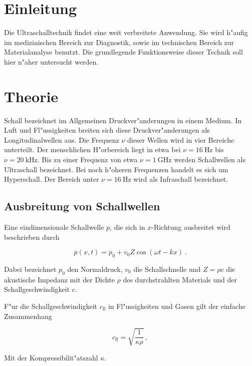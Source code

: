 \section{Einleitung} %
\label{sec:einleitung}
	Die Ultraschalltechnik findet eine weit verbreitete Anwendung.
	Sie wird h"aufig im medizinischen Bereich zur Diagnostik, sowie im technischen Bereich zur Materialanalyse benutzt.
	Die grundlegende Funktionsweise dieser Technik soll hier n"aher untersucht werden.
\section{Theorie} %
\label{sec:theorie}
	Schall bezeichnet im Allgemeinen Druckver"anderungen in einem Medium.
	In Luft und Fl"ussigkeiten breiten sich diese Druckver"anderungen als Longitudinalwellen aus.
	Die Frequenz $\nu$ dieser Wellen wird in vier Bereiche unterteilt.
	Der menschlichen H"orbereich liegt in etwa bei $\nu = \SI{16}{\hertz}$ bis $\nu = \SI{20}{\kilo \hertz}$.
	Bis zu einer Frequenz von etwa $\nu = \SI{1}{\giga \hertz}$ werden Schallwellen als Ultraschall bezeichnet.
	Bei noch h"oheren Frequenzen handelt es sich um Hyperschall.
	Der Bereich unter $\nu = \SI{16}{\hertz}$ wird als Infraschall bezeichnet.

	\subsection{Ausbreitung von Schallwellen}
	\label{subsec:ausbreitung}

		Eine eindimensionale Schallwelle $p$, die sich in $x$-Richtung ausbreitet wird beschrieben durch

		\begin{equation}
			p(x,t) = p_0 + v_0 Z \cos{(\omega t - kx)} \,.
		\end{equation}

		Dabei bezeichnet $p_0$ den Normaldruck, $v_0$ die Schallschnelle und $Z = \rho c$ die akustische Impedanz mit der Dichte $\rho$ des durchstrahlten Materials und der Schallgeschwindigkeit $c$.

		F"ur die Schallgeschwindigkeit $c_\mathrm{fl}$ in Fl"ussigkeiten und Gasen gilt der einfache Zusammenhang

		\begin{equation}
			c_\mathrm{fl} = \sqrt{\frac{1}{\kappa \rho}} \,,
		\end{equation}

		Mit der Kompressibilit"atszahl $\kappa$. \\

